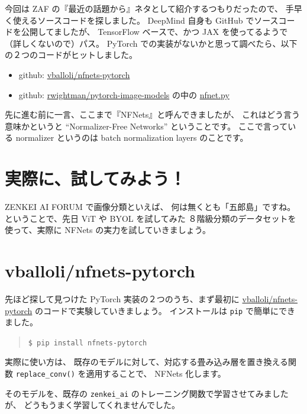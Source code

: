 \documentclass[dvipdfmx,autodetect-engine,10pt,b5paper,papersize,openany,dvipsnames]{jsbook}
\begin{document}
\begin{multicols}{2}
今回は ZAF の『最近の話題から』ネタとして紹介するつもりだったので、
手早く使えるソースコードを探しました。
DeepMind 自身も GitHub でソースコードを公開してましたが、
TensorFlow ベースで、かつ JAX を使ってるようで
（詳しくないので）パス。
PyTorch での実装がないかと思って調べたら、以下の２つのコードがヒットしました。
\begin{itemize}
\item github: \href{https://github.com/vballoli/nfnets-pytorch}{vballoli/nfnets-pytorch}
\item github: \href{https://github.com/rwightman/pytorch-image-models}{rwightman/pytorch-image-models}
  の中の \href{https://github.com/rwightman/pytorch-image-models/blob/master/timm/models/nfnet.py}{nfnet.py}
\end{itemize}

先に進む前に一言、ここまで『NFNets』と呼んできましたが、
これはどう言う意味かというと ``Normalizer-Free Networks'' ということです。
ここで言っている normalizer というのは batch normalization layers のことです。


\section{実際に、試してみよう！}
ZENKEI AI FORUM で画像分類といえば、
何は無くとも「五郎島」ですね。
ということで、先日 ViT や BYOL を試してみた
８階級分類のデータセットを使って、実際に NFNets の実力を試していきましょう。


\section{vballoli/nfnets-pytorch}
先ほど探して見つけた PyTorch 実装の２つのうち、まず最初に
\href{https://github.com/vballoli/nfnets-pytorch}{vballoli/nfnets-pytorch}
のコードで実験していきましょう。
インストールは \texttt{pip} で簡単にできました。
\begin{quote}
  \texttt{\$ pip install nfnets-pytorch}
\end{quote}
実際に使い方は、
既存のモデルに対して、対応する畳み込み層を置き換える関数
\texttt{replace\_conv()} を適用することで、
NFNets 化します。

そのモデルを、既存の \texttt{zenkei\_ai} のトレーニング関数で学習させてみましたが、
どうもうまく学習してくれませんでした。



\end{multicols}
\end{document}
